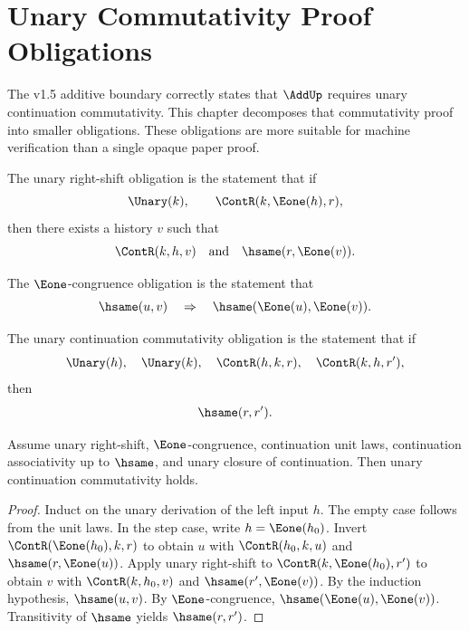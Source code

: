 \chapter{Unary Commutativity Proof Obligations}
\label{ch:v151-unary-obligations}

The v1.5 additive boundary correctly states that \(\AddUp\) requires unary continuation commutativity. This chapter decomposes that commutativity proof into smaller obligations. These obligations are more suitable for machine verification than a single opaque paper proof.

\begin{definition}
The unary right-shift obligation is the statement that if
\[
  \Unary(k),
  \qquad
  \ContR(k,\Eone(h),r),
\]
then there exists a history \(v\) such that
\[
  \ContR(k,h,v)
  \quad\text{and}\quad
  \hsame(r,\Eone(v)).
\]
\end{definition}

\begin{definition}
The \(\Eone\)-congruence obligation is the statement that
\[
  \hsame(u,v)
  \quad\Rightarrow\quad
  \hsame(\Eone(u),\Eone(v)).
\]
\end{definition}

\begin{definition}
The unary continuation commutativity obligation is the statement that if
\[
  \Unary(h),\quad \Unary(k),\quad
  \ContR(h,k,r),\quad \ContR(k,h,r'),
\]
then
\[
  \hsame(r,r').
\]
\end{definition}

\begin{theorem}
\label{thm:v151-comm-from-obligations}
Assume unary right-shift, \(\Eone\)-congruence, continuation unit laws, continuation associativity up to \(\hsame\), and unary closure of continuation. Then unary continuation commutativity holds.
\end{theorem}

\begin{proof}
Induct on the unary derivation of the left input \(h\). The empty case follows from the unit laws. In the step case, write \(h=\Eone(h_0)\). Invert \(\ContR(\Eone(h_0),k,r)\) to obtain \(u\) with \(\ContR(h_0,k,u)\) and \(\hsame(r,\Eone(u))\). Apply unary right-shift to \(\ContR(k,\Eone(h_0),r')\) to obtain \(v\) with \(\ContR(k,h_0,v)
\) and \(\hsame(r',\Eone(v))\). By the induction hypothesis, \(\hsame(u,v)\). By \(\Eone\)-congruence, \(\hsame(\Eone(u),\Eone(v))\). Transitivity of \(\hsame\) yields \(\hsame(r,r')\).
\end{proof}

